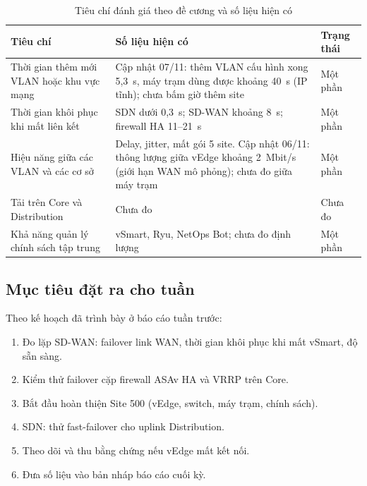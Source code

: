 \begin{table}[H]
    \centering
    \small
    \caption{Tiêu chí đánh giá theo đề cương và số liệu hiện có}
    \label{tab:tieu_chi}
    \begin{tabularx}{\textwidth}{|P{4.4cm}|X|P{2.0cm}|}
        \hline
        \textbf{Tiêu chí} & \textbf{Số liệu hiện có} & \textbf{Trạng thái} \\
        \hline
        Thời gian thêm mới VLAN hoặc khu vực mạng & Cập nhật 07/11: thêm VLAN cấu hình xong 5,3~s, máy trạm dùng được khoảng 40~s (IP tĩnh); chưa bấm giờ thêm site & Một phần \\
        \hline
        Thời gian khôi phục khi mất liên kết & SDN dưới 0,3~s; SD-WAN khoảng 8~s; firewall HA 11--21~s & Một phần \\
        \hline
        Hiệu năng giữa các VLAN và các cơ sở & Delay, jitter, mất gói 5 site. Cập nhật 06/11: thông lượng giữa vEdge khoảng 2~Mbit/s (giới hạn WAN mô phỏng); chưa đo giữa máy trạm & Một phần \\
        \hline
        Tải trên Core và Distribution & Chưa đo & Chưa đo \\
        \hline
        Khả năng quản lý chính sách tập trung & vSmart, Ryu, NetOps Bot; chưa đo định lượng & Một phần \\
        \hline
    \end{tabularx}
\end{table}

\subsection{Mục tiêu đặt ra cho tuần}

Theo kế hoạch đã trình bày ở báo cáo tuần trước:

\begin{enumerate}
    \item Đo lặp SD-WAN: failover link WAN, thời gian khôi phục khi mất vSmart, độ sẵn sàng.
    \item Kiểm thử failover cặp firewall ASAv HA và VRRP trên Core.
    \item Bắt đầu hoàn thiện Site 500 (vEdge, switch, máy trạm, chính sách).
    \item SDN: thử fast-failover cho uplink Distribution.
    \item Theo dõi và thu bằng chứng nếu vEdge mất kết nối.
    \item Đưa số liệu vào bản nháp báo cáo cuối kỳ.
\end{enumerate}

